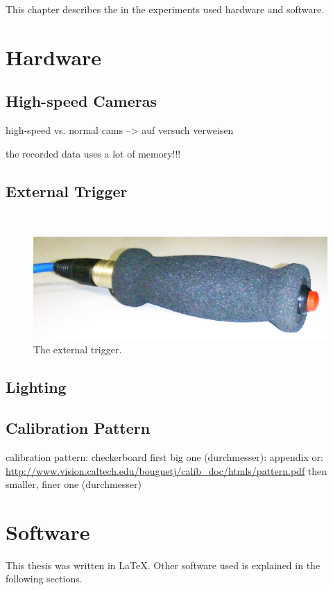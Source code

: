 This chapter describes the in the experiments used hardware and software.  
\section{Hardware} \label{sec:Hardware}
\subsection{High-speed Cameras}

high-speed vs. normal cams --> auf versuch verweisen

the recorded data uses a lot of memory!!!

\subsection{External Trigger}\label{ssec:ExTrigger}
\\

\begin{figure}[htbp]
		\centering
		\includegraphics[width=1.0\textwidth]{figures/Trigger}
		\caption[External trigger]{The external trigger.}
		\label{fig:ExTrigger}
\end{figure}

\subsection{Lighting}

\subsection{Calibration Pattern}
calibration pattern: checkerboard
first big one (durchmesser): appendix or: \url{http://www.vision.caltech.edu/bouguetj/calib_doc/htmls/pattern.pdf}
then smaller, finer one (durchmesser)


\section{Software} \label{sec:Software}
This thesis was written in \LaTeX . Other software used is explained in the following sections.

